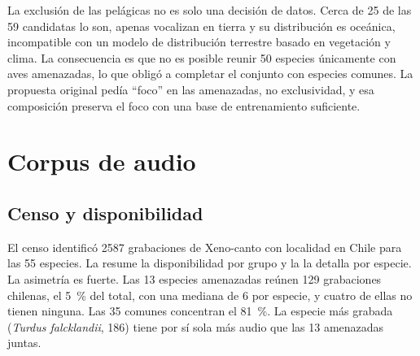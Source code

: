 La exclusión de las pelágicas no es solo una decisión de datos. Cerca de 25
de las 59 candidatas lo son, apenas vocalizan en tierra y su distribución es
oceánica, incompatible con un modelo de distribución terrestre basado en
vegetación y clima. La consecuencia es que no es posible reunir 50 especies
únicamente con aves amenazadas, lo que obligó a completar el conjunto con
especies comunes. La propuesta original pedía ``foco'' en las amenazadas, no
exclusividad, y esa composición preserva el foco con una base de
entrenamiento suficiente.

\section{Corpus de audio}\label{sec:corpus-audio}

\subsection{Censo y disponibilidad}

El censo identificó \num{2587} grabaciones de Xeno-canto con localidad en
Chile para las 55 especies. La  resume la
disponibilidad por grupo y la  la detalla por especie. La
asimetría es fuerte. Las 13 especies amenazadas reúnen 129 grabaciones
chilenas, el \SI{5}{\percent} del total, con una mediana de 6 por especie, y
cuatro de ellas no tienen ninguna. Las 35 comunes concentran el
\SI{81}{\percent}. La especie más grabada (\textit{Turdus falcklandii}, 186)
tiene por sí sola más audio que las 13 amenazadas juntas.

\begin{table}[!htb]
  \centering\small
  \caption{Grabaciones de Xeno-canto con localidad en Chile por grupo de
  especies del conjunto objetivo.}
  \label{tab:corpus-grupos}
\end{table}

